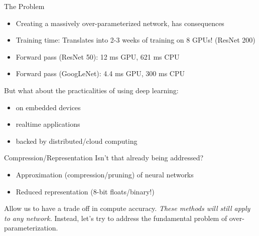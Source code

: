 \documentclass[t,xcolor=dvipsnames]{beamer}
\begin{document}
\begin{frame}{The Problem}
\begin{itemize}
    \item Creating a massively over-parameterized network, has consequences
    \item Training time: Translates into 2-3 weeks of training on 8 GPUs! (ResNet 200)
    \item Forward pass (ResNet 50): 12 ms GPU, 621 ms CPU
    \item Forward pass (GoogLeNet): 4.4 ms GPU, 300 ms CPU
\end{itemize}
\vfill
But what about the practicalities of using deep learning:
\begin{itemize}
    \item on embedded devices
    \item realtime applications
    \item backed by distributed/cloud computing
\end{itemize}
\end{frame}

\begin{frame}{Compression/Representation}
Isn't that already being addressed?
\begin{itemize}
\item Approximation (compression/pruning) of neural networks
\item Reduced representation (8-bit floats/binary!)
\end{itemize}
Allow us to have a trade off in compute \vs accuracy.
\vfill
\textit{These methods will still apply to any network.} Instead, let's try to  address the fundamental problem of over-parameterization.
\end{frame}
\end{document}
